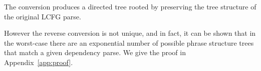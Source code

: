 \documentclass[11pt,letterpaper]{article}
\begin{document}


The conversion produces a directed tree rooted by preserving the tree structure of the original LCFG parse.

However the reverse conversion is not unique, and in fact, it can be shown that in the worst-case there are an
exponential number of possible phrase structure trees that match a given dependency parse. We give the proof in
Appendix~\ref{app:proof}.



























\end{document}
